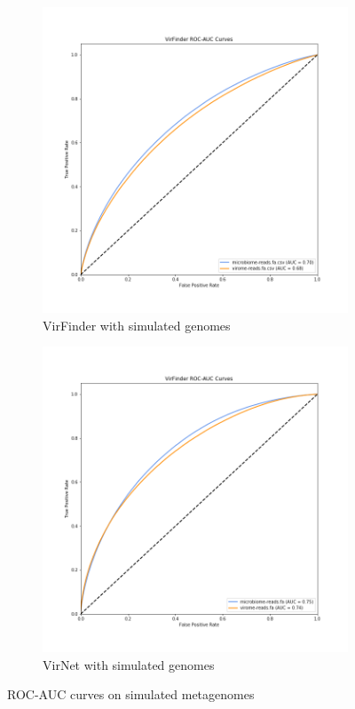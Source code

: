 \begin{figure}[!htbp]
	\centering	
	\begin{subfigure}{0.5\textwidth}
	\includegraphics[width=\linewidth]{Pictures/roc_auc_simulated.png}
	\caption{VirFinder with simulated genomes} 
	\label{fig:roc_auc_virfinderb}
\end{subfigure}
\begin{subfigure}{0.5\textwidth}
	\includegraphics[width=\linewidth]{Pictures/virnet_roc_auc_simulated.png}
	\caption{VirNet with simulated genomes} 
	\label{fig:roc_auc_virnetb}

\end{subfigure}
		\caption{ROC-AUC curves on simulated metagenomes} 
		\label{fig:roc_auc_virfinder2}
\end{figure}

